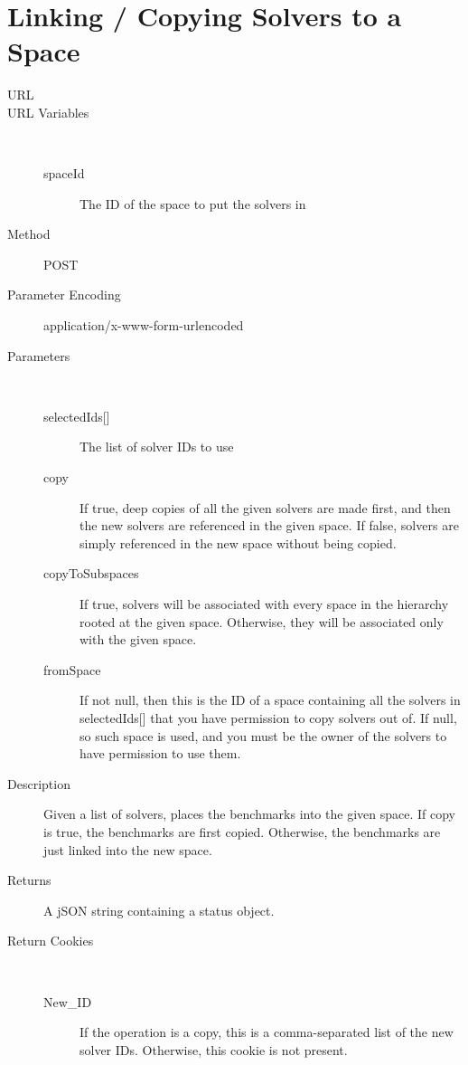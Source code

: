 \section{Linking / Copying Solvers to a Space}
\begin{description}
\item [URL] 
\item [URL Variables] \
	\begin{description}
	\item [spaceId]  The ID of the space to put the solvers in
	\end{description}
\item [Method] POST
\item [Parameter Encoding] application/x-www-form-urlencoded
\item [Parameters] \
	\begin{description}
	\item [{selectedIds[]}]  The list of solver IDs to use
	\item [copy]  If true, deep copies of all the given solvers are made first, and then the new solvers are referenced in the given space. If false, solvers are simply referenced in the new space without being copied.
	\item [copyToSubspaces] \type{Boolean} If true, solvers will be associated with every space in the hierarchy rooted at the given space. Otherwise, they will be associated only with the given space.
	\item [fromSpace] \type{Integer} If not null, then this is the ID of a space containing all the solvers in selectedIds[] that you have permission to copy solvers out of. If null, so such space is used, and you must be the owner of the solvers to have permission to use them.
	\end{description}
\item [Description] Given a list of solvers, places the benchmarks into the given space. If copy is true, the benchmarks are first copied. Otherwise, the benchmarks are just linked into the new space.
\item [Returns] A jSON string containing a status object.
\item [Return Cookies] \
	\begin{description}
	\item [New\_ID] \type{Integer} If the operation is a copy, this is a comma-separated list of the new solver IDs. Otherwise, this cookie is not present.
	\end{description}
\end{description}

